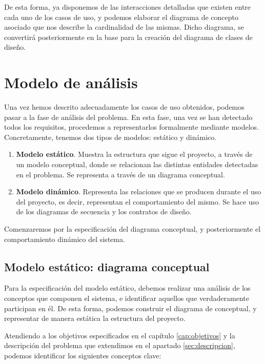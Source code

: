 De esta forma, ya disponemos de las interacciones detalladas que existen entre cada uno de los casos de uso, y podemos elaborar el diagrama de concepto asociado que nos describe la cardinalidad de las mismas. Dicho diagrama, se convertirá posteriormente en la base para la creación del diagrama de clases de diseño.

\section{Modelo de análisis}
Una vez hemos descrito adecuadamente los casos de uso obtenidos, podemos pasar a la fase de análisis del problema. En esta fase, una vez se han detectado todos los requisitos, procedemos a representarlos formalmente mediante modelos. Concretamente, tenemos dos tipos de modelos: estático y dinámico.

\begin{enumerate}
	\item \textbf{Modelo estático}.  Muestra la estructura que sigue el proyecto, a través de un modelo conceptual, donde se relacionan las distintas entidades detectadas en el problema. Se representa a través de un diagrama conceptual.
	\item \textbf{Modelo dinámico}. Representa las relaciones que se producen durante el uso del proyecto, es decir, representan el comportamiento del mismo. Se hace uso de los diagramas de secuencia y los contratos de diseño.
\end{enumerate} 

Comenzaremos por la especificación del diagrama conceptual, y posteriormente el comportamiento dinámico del sistema.

\subsection{Modelo estático: diagrama conceptual}

Para la especificación del modelo estático, debemos realizar una análisis de los conceptos que componen el sistema, e identificar aquellos que verdaderamente participan en él. De esta forma, podemos construir el diagrama de conceptual, y representar de manera estática la estructura del proyecto.

Atendiendo a los objetivos especificados en el capítulo \ref{cap:objetivos} y la descripción del problema que extendimos en el apartado \ref{sec:descripcion}, podemos identificar los siguientes conceptos clave:

